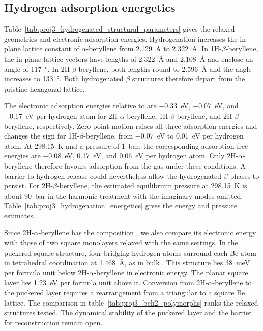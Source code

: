 \FloatBarrier
\subsection{Hydrogen adsorption energetics}
\label{3_hydrogen_adsorption_energetics}

Table~\ref{tab:proj3_hydrogenated_structural_parameters} gives the relaxed geometries and electronic adsorption energies.
Hydrogenation increases the in-plane lattice constant of $\alpha$-beryllene from \qty{2.129}{\angstrom} to \qty{2.322}{\angstrom}.
In 1H-$\beta$-beryllene, the in-plane lattice vectors have lengths of \qty{2.322}{\angstrom} and \qty{2.108}{\angstrom} and enclose an angle of \qty{117}{\degree}.
In 2H-$\beta$-beryllene, both lengths round to \qty{2.596}{\angstrom} and the angle increases to \qty{133}{\degree}.
Both hydrogenated $\beta$ structures therefore depart from the pristine hexagonal lattice.

The electronic adsorption energies relative to  are \qty{-0.33}{\electronvolt}, \qty{-0.07}{\electronvolt}, and \qty{-0.17}{\electronvolt} per hydrogen atom for 2H-$\alpha$-beryllene, 1H-$\beta$-beryllene, and 2H-$\beta$-beryllene, respectively.
Zero-point motion raises all three adsorption energies and changes the sign for 1H-$\beta$-beryllene, from \qty{-0.07}{\electronvolt} to \qty{0.01}{\electronvolt} per hydrogen atom.
At \qty{298.15}{\kelvin} and a  pressure of \qty{1}{\bar}, the corresponding adsorption free energies are \qty{-0.08}{\electronvolt}, \qty{0.17}{\electronvolt}, and \qty{0.06}{\electronvolt} per hydrogen atom.
Only 2H-$\alpha$-beryllene therefore favours adsorption from the gas under these conditions.
A barrier to hydrogen release could nevertheless allow the hydrogenated $\beta$ phases to persist.
For 2H-$\beta$-beryllene, the estimated equilibrium  pressure at \qty{298.15}{\kelvin} is about \qty{90}{\bar} in the harmonic treatment with the imaginary modes omitted.
Table~\ref{tab:proj3_hydrogenation_energetics} gives the energy and pressure estimates.

Since 2H-$\alpha$-beryllene has the composition , we also compare its electronic energy with those of two square  monolayers relaxed with the same settings.
In the puckered square structure, four bridging hydrogen atoms surround each Be atom in tetrahedral coordination at \qty{1.468}{\angstrom}, as in bulk .
This structure lies \qty{38}{\milli\electronvolt} per formula unit below 2H-$\alpha$-beryllene in electronic energy.
The planar square layer lies \qty{1.23}{\electronvolt} per formula unit above it.
Conversion from 2H-$\alpha$-beryllene to the puckered layer requires a rearrangement from a triangular to a square Be lattice.
The comparison in table~\ref{tab:proj3_beh2_polymorphs} ranks the relaxed structures tested.
The dynamical stability of the puckered layer and the barrier for reconstruction remain open.

